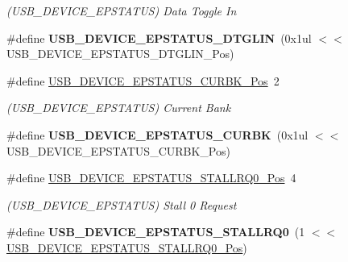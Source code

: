 \begin{DoxyCompactItemize}
\begin{DoxyCompactList}\small\item\em (U\+S\+B\+\_\+\+D\+E\+V\+I\+C\+E\+\_\+\+E\+P\+S\+T\+A\+T\+U\+S) Data Toggle In \end{DoxyCompactList}\item 
\hypertarget{group___s_a_m_l21___u_s_b_gacb109d50174104fe8b043a4376de8d31}{}\#define {\bfseries U\+S\+B\+\_\+\+D\+E\+V\+I\+C\+E\+\_\+\+E\+P\+S\+T\+A\+T\+U\+S\+\_\+\+D\+T\+G\+L\+I\+N}~(0x1ul $<$$<$ U\+S\+B\+\_\+\+D\+E\+V\+I\+C\+E\+\_\+\+E\+P\+S\+T\+A\+T\+U\+S\+\_\+\+D\+T\+G\+L\+I\+N\+\_\+\+Pos)\label{group___s_a_m_l21___u_s_b_gacb109d50174104fe8b043a4376de8d31}

\item 
\hypertarget{group___s_a_m_l21___u_s_b_gabdd7b3bcfbcec69d09e2291cf07b27f5}{}\#define \hyperlink{group___s_a_m_l21___u_s_b_gabdd7b3bcfbcec69d09e2291cf07b27f5}{U\+S\+B\+\_\+\+D\+E\+V\+I\+C\+E\+\_\+\+E\+P\+S\+T\+A\+T\+U\+S\+\_\+\+C\+U\+R\+B\+K\+\_\+\+Pos}~2\label{group___s_a_m_l21___u_s_b_gabdd7b3bcfbcec69d09e2291cf07b27f5}

\begin{DoxyCompactList}\small\item\em (U\+S\+B\+\_\+\+D\+E\+V\+I\+C\+E\+\_\+\+E\+P\+S\+T\+A\+T\+U\+S) Current Bank \end{DoxyCompactList}\item 
\hypertarget{group___s_a_m_l21___u_s_b_gaa25e492984b843de4bd68912d0c2fc1c}{}\#define {\bfseries U\+S\+B\+\_\+\+D\+E\+V\+I\+C\+E\+\_\+\+E\+P\+S\+T\+A\+T\+U\+S\+\_\+\+C\+U\+R\+B\+K}~(0x1ul $<$$<$ U\+S\+B\+\_\+\+D\+E\+V\+I\+C\+E\+\_\+\+E\+P\+S\+T\+A\+T\+U\+S\+\_\+\+C\+U\+R\+B\+K\+\_\+\+Pos)\label{group___s_a_m_l21___u_s_b_gaa25e492984b843de4bd68912d0c2fc1c}

\item 
\hypertarget{group___s_a_m_l21___u_s_b_gaaef5c9dbdf17a2e001dcdf5b4eb9d49c}{}\#define \hyperlink{group___s_a_m_l21___u_s_b_gaaef5c9dbdf17a2e001dcdf5b4eb9d49c}{U\+S\+B\+\_\+\+D\+E\+V\+I\+C\+E\+\_\+\+E\+P\+S\+T\+A\+T\+U\+S\+\_\+\+S\+T\+A\+L\+L\+R\+Q0\+\_\+\+Pos}~4\label{group___s_a_m_l21___u_s_b_gaaef5c9dbdf17a2e001dcdf5b4eb9d49c}

\begin{DoxyCompactList}\small\item\em (U\+S\+B\+\_\+\+D\+E\+V\+I\+C\+E\+\_\+\+E\+P\+S\+T\+A\+T\+U\+S) Stall 0 Request \end{DoxyCompactList}\item 
\hypertarget{group___s_a_m_l21___u_s_b_gabfdc15c79e2beeaebd2e9fd02189e252}{}\#define {\bfseries U\+S\+B\+\_\+\+D\+E\+V\+I\+C\+E\+\_\+\+E\+P\+S\+T\+A\+T\+U\+S\+\_\+\+S\+T\+A\+L\+L\+R\+Q0}~(1 $<$$<$ \hyperlink{group___s_a_m_l21___u_s_b_gaaef5c9dbdf17a2e001dcdf5b4eb9d49c}{U\+S\+B\+\_\+\+D\+E\+V\+I\+C\+E\+\_\+\+E\+P\+S\+T\+A\+T\+U\+S\+\_\+\+S\+T\+A\+L\+L\+R\+Q0\+\_\+\+Pos})\label{group___s_a_m_l21___u_s_b_gabfdc15c79e2beeaebd2e9fd02189e252}


\end{DoxyCompactItemize}
